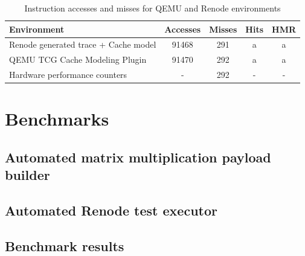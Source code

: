 \begin{center}
\begin{table}[h!]
\centering
\begin{tabular}{|l|c|c|c|c|}
\hline
\textbf{Environment} & \textbf{Accesses} & \textbf{Misses} & \textbf{Hits} & \textbf{HMR} \\ \hline
Renode generated trace + Cache model    & 91468        & 291         & a & a\\ \hline
QEMU TCG Cache Modeling Plugin          & 91470        & 292         & a & a\\ \hline
Hardware performance counters          & -        & 292         & - & -\\ \hline
\end{tabular}
\caption{Instruction accesses and misses for QEMU and Renode environments}
\label{table:cache_results}
\end{table}
\end{center}

\section{Benchmarks}
\subsection{Automated matrix multiplication payload builder}
\subsection{Automated Renode test executor} \label{sec:renodetestexecutor}
\subsection{Benchmark results}
